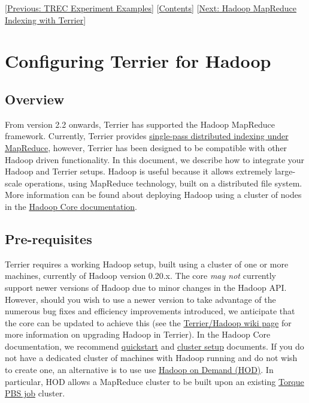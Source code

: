 {[}\href{trec_examples.html}{Previous: TREC Experiment Examples}{]}
{[}\href{index.html}{Contents}{]} {[}\href{hadoop_indexing.html}{Next:
Hadoop MapReduce Indexing with Terrier}{]}\\

\section{Configuring Terrier for
Hadoop}\label{configuring-terrier-for-hadoop}

\subsection{Overview}\label{overview}

From version 2.2 onwards, Terrier has supported the Hadoop MapReduce
framework. Currently, Terrier provides
\href{hadoop_indexing.html}{single-pass distributed indexing under
MapReduce}, however, Terrier has been designed to be compatible with
other Hadoop driven functionality. In this document, we describe how to
integrate your Hadoop and Terrier setups. Hadoop is useful because it
allows extremely large-scale operations, using MapReduce technology,
built on a distributed file system. More information can be found about
deploying Hadoop using a cluster of nodes in the
\href{http://hadoop.apache.org/core/docs/current/}{Hadoop Core
documentation}.

\subsection{Pre-requisites}\label{pre-requisites}

Terrier requires a working Hadoop setup, built using a cluster of one or
more machines, currently of Hadoop version 0.20.x. The core \emph{may
not} currently support newer versions of Hadoop due to minor changes in
the Hadoop API. However, should you wish to use a newer version to take
advantage of the numerous bug fixes and efficiency improvements
introduced, we anticipate that the core can be updated to achieve this
(see the
\href{http://ir.dcs.gla.ac.uk/wiki/Terrier/Hadoop}{Terrier/Hadoop wiki
page} for more information on upgrading Hadoop in Terrier). In the
Hadoop Core documentation, we recommend
\href{http://hadoop.apache.org/docs/r0.19.0/quickstart.html}{quickstart}
and
\href{http://hadoop.apache.org/docs/r0.19.0/cluster_setup.html}{cluster
setup} documents. If you do not have a dedicated cluster of machines
with Hadoop running and do not wish to create one, an alternative is to
use use
\href{http://hadoop.apache.org/docs/r0.19.0/hod_user_guide.html}{Hadoop
on Demand (HOD)}. In particular, HOD allows a MapReduce cluster to be
built upon an existing
\href{http://www.adaptivecomputing.com/products/open-source/torque/}{Torque
PBS job} cluster.

